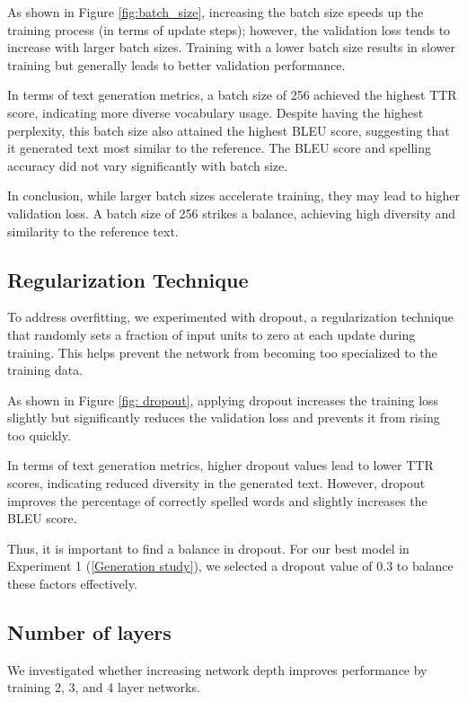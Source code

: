 \documentclass{article}
\begin{document}
As shown in Figure \ref{fig:batch_size}, increasing the batch size speeds up the training process (in terms of update steps); however, the validation loss tends to increase with larger batch sizes. Training with a lower batch size results in slower training but generally leads to better validation performance.

In terms of text generation metrics, a batch size of 256 achieved the highest TTR score, indicating more diverse vocabulary usage. Despite having the highest perplexity, this batch size also attained the highest BLEU score, suggesting that it generated text most similar to the reference. The BLEU score and spelling accuracy did not vary significantly with batch size.

In conclusion, while larger batch sizes accelerate training, they may lead to higher validation loss. A batch size of 256 strikes a balance, achieving high diversity and similarity to the reference text.

\subsection{Regularization Technique}

To address overfitting, we experimented with dropout, a regularization technique that randomly sets a fraction of input units to zero at each update during training. This helps prevent the network from becoming too specialized to the training data.

As shown in Figure \ref{fig: dropout}, applying dropout increases the training loss slightly but significantly reduces the validation loss and prevents it from rising too quickly.

In terms of text generation metrics, higher dropout values lead to lower TTR scores, indicating reduced diversity in the generated text. However, dropout improves the percentage of correctly spelled words and slightly increases the BLEU score.

Thus, it is important to find a balance in dropout. For our best model in Experiment 1 (\ref{Generation study}), we selected a dropout value of 0.3 to balance these factors effectively.



\subsection{Number of layers}

We investigated whether increasing network depth improves performance by training 2, 3, and 4 layer networks.
\end{document}
